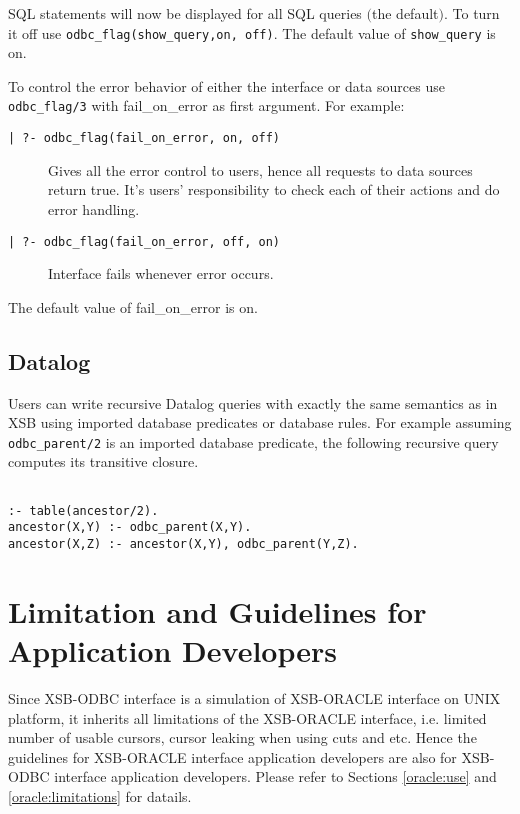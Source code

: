 SQL statements will now be displayed for all SQL queries $($the default$)$.
To turn it off use {\tt odbc\_flag(show\_query,on, off)}.  The default value 
of {\tt show\_query} is on.

To control the error behavior of either the interface or
data sources use {\tt odbc\_flag/3} with fail\_on\_error as first argument.
For example:

\begin{description}

\item[\tt | ?- odbc\_flag(fail\_on\_error, on, off)] Gives all the error control 
to users, hence all requests to data sources return true.  It's users' 
responsibility to check each of their actions and do error handling.

\item[\tt | ?- odbc\_flag(fail\_on\_error, off, on)] Interface fails whenever 
error occurs.
\end{description}

The default value of fail\_on\_error is on.


\subsection{Datalog}
Users can write recursive Datalog queries with exactly the same
semantics as in XSB using imported database predicates or database
rules.  For example assuming {\tt odbc\_parent/2} is an imported database
predicate, the following recursive query computes its transitive closure.

\begin{verbatim}

:- table(ancestor/2).
ancestor(X,Y) :- odbc_parent(X,Y).
ancestor(X,Z) :- ancestor(X,Y), odbc_parent(Y,Z).
\end{verbatim}


\section{Limitation and Guidelines for Application Developers} \label{Guide}
Since XSB-ODBC interface is a simulation of XSB-ORACLE interface on UNIX 
platform, it inherits all limitations of the XSB-ORACLE interface, i.e. limited 
number of usable cursors, cursor leaking when using cuts and etc.  Hence 
the guidelines for XSB-ORACLE interface application 
developers are also for XSB-ODBC interface application developers.  
Please refer to Sections \ref{oracle:use} and \ref{oracle:limitations}
for datails. 

